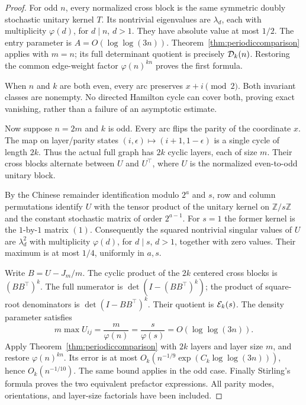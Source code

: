 \begin{proof}
For odd \(n\), every normalized cross block is the same
symmetric doubly stochastic unitary kernel \(T\).
Its nontrivial eigenvalues are \(\lambda_d\), each with
multiplicity \(\varphi(d)\), for \(d\mid n\), \(d>1\).
They have absolute value at most \(1/2\).
The entry parameter is \(A=O(\log\log(3n))\).
Theorem~\ref{thm:periodiccomparison} applies with \(m=n\);
its full determinant quotient is precisely \({\cal D}_k(n)\).
Restoring the common edge-weight factor
\(\varphi(n)^{kn}\) proves the first formula.

When \(n\) and \(k\) are both even, every arc preserves
\(x+i\pmod2\). Both invariant classes are nonempty.
No directed Hamilton cycle can cover both, proving exact
vanishing, rather than a failure of an asymptotic estimate.

Now suppose \(n=2m\) and \(k\) is odd.
Every arc flips the parity of the coordinate \(x\).
The map on layer/parity states
\((i,\epsilon)\mapsto(i+1,1-\epsilon)\) is a single cycle
of length \(2k\). Thus the actual full graph has \(2k\)
cyclic layers, each of size \(m\).
Their cross blocks alternate between \(U\) and \(U^\top\),
where \(U\) is the normalized even-to-odd unitary block.

By the Chinese remainder identification modulo \(2^a\)
and \(s\), row and column permutations identify \(U\) with
the tensor product of the unitary kernel on
\(\mathbb Z/s\mathbb Z\) and the constant stochastic
matrix of order \(2^{a-1}\).
For \(s=1\) the former kernel is the \(1\)-by-\(1\) matrix \((1)\).
Consequently the squared nontrivial singular values of \(U\)
are \(\lambda_d^2\) with multiplicity \(\varphi(d)\),
for \(d\mid s\), \(d>1\), together with zero values.
Their maximum is at most \(1/4\), uniformly in \(a,s\).

Write \(B=U-J_m/m\). The cyclic product of the \(2k\)
centered cross blocks is \((BB^\top)^k\).
The full numerator is \(\det(I-(BB^\top)^k)\);
the product of square-root denominators is
\(\det(I-BB^\top)^k\).
Their quotient is \({\cal E}_k(s)\).
The density parameter satisfies
\[
 m\max U_{ij}=\frac{m}{\varphi(n)}
            =\frac{s}{\varphi(s)}
               =O(\log\log(3n)).
\]
Apply Theorem~\ref{thm:periodiccomparison} with \(2k\) layers
and layer size \(m\), and restore \(\varphi(n)^{kn}\).
Its error is at most
\(O_k(n^{-1/9}\exp(C_k\log\log(3n)))\), hence
\(O_k(n^{-1/10})\).
The same bound applies in the odd case.
Finally Stirling's formula proves the two equivalent
prefactor expressions. All parity modes, orientations,
and layer-size factorials have been included.
\end{proof}


